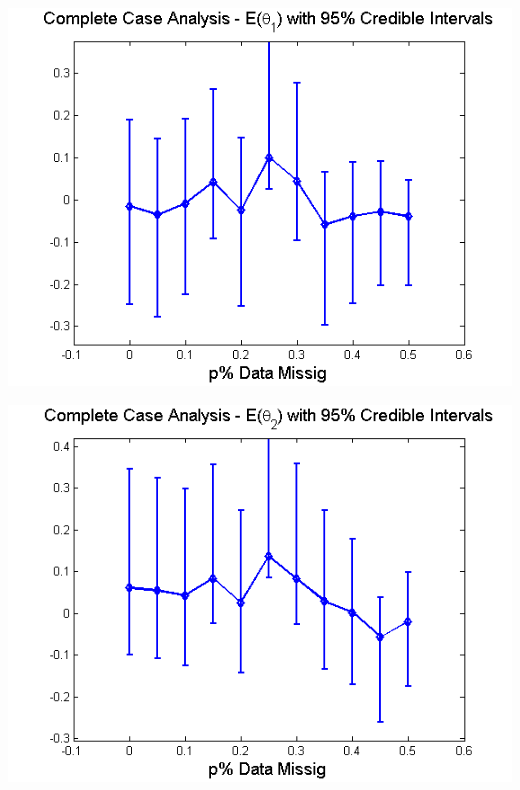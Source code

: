 \documentclass{article}
\begin{document}
\begin{itemize}
\begin{left}
\includegraphics[scale=0.5]{CCTheta1_Conf.png}
\end{left}
\begin{right}
\includegraphics[scale=0.5]{CCTheta2_Conf.png}\\
\end{right}

\noindent 

\end{itemize}

\pagebreak
{}\\

\end{document}

